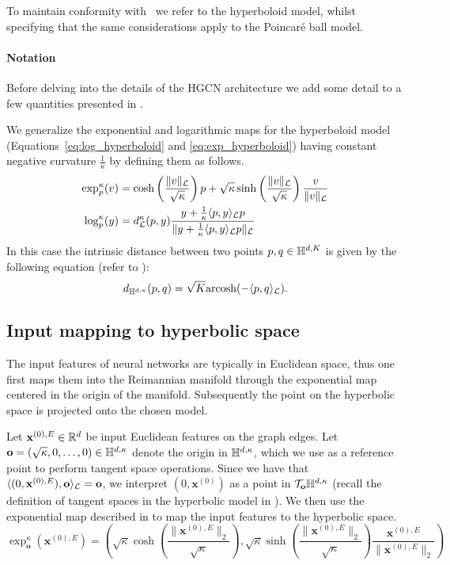 To maintain conformity with~\cite{chami2019HGCN} we refer to the hyperboloid model, whilst specifying that the same considerations apply to the Poincaré ball model.

\paragraph{Notation}
Before delving into the details of the HGCN architecture we add some detail to a few quantities presented in . 

We generalize the exponential and logarithmic maps for the hyperboloid model (Equations~\eqref{eq:log_hyperboloid} and \eqref{eq:exp_hyperboloid}) having constant negative curvature $\frac{1}{\kappa}$ by defining them as follows.
\begin{align}
    \exp_p^\kappa(v) &= \cosh\left(\frac{\|v\|_{\mathcal{L}}}{\sqrt{\kappa}}\right)p + \sqrt{\kappa}\sinh\left(\frac{\|v\|_{\mathcal{L}}}{\sqrt{\kappa}}\right) \frac{v}{\|v\|_{\mathcal{L}}} \label{eq:expk_hyperboloid}\\
    \log_p^\kappa(y) &= d_{\mathcal{L}}^\kappa(p,y)\frac{y + \frac{1}{\kappa}\langle p,y \rangle_{\mathcal{L}}p}{\|y + \frac{1}{\kappa}\langle p,y \rangle_{\mathcal{L}}p\|_{\mathcal{L}}} \label{eq:logk_hyperboloid}
\end{align}
In this case the intrinsic distance between two points $p, q\in\mathbb{H}^{d,K}$ is given by the following equation (refer to ):
\begin{equation*}
    d_{\mathbb{H}^{d,\kappa}}(p, q) = \sqrt{K}\text{arcosh}(-\langle p, q \rangle_{\mathcal{L}}).
\end{equation*}

\subsection{Input mapping to hyperbolic space}
The input features of neural networks are typically in Euclidean space, thus one first maps them into the Reimannian manifold through the exponential map centered in the origin of the manifold. Subsequently the point on the hyperbolic space is projected onto the chosen model.

Let $\mathbf{x}^{(0), E}\in\mathbb{R}^d$ be input Euclidean features on the graph edges. Let $\mathbf{o}=(\sqrt{\kappa}, 0, \dots,0)\in \mathbb{H}^{d,\kappa}$ denote the origin in $\mathbb{H}^{d,\kappa}$, which we use as a reference point to perform tangent space operations. Since we have that $\langle({0},\mathbf{x}^{(0), E}), \mathbf{o}\rangle_{\mathcal{L}}=\mathbf{o}$, we interpret $({0},\mathbf{x}^{(0)})$ as a point in $\mathcal{T}_\mathbf{o}\mathbb{H}^{d,\kappa}$ (recall the definition of tangent spaces in the hyperbolic model in ). We then use the exponential map described in  to map the input features to the hyperbolic space.
\begin{equation}
    \exp_{\mathbf{o}}^\kappa(\mathbf{x}^{(0), E}) = \left(\sqrt{\kappa}\cosh\left(\frac{\|\mathbf{x}^{(0), E}\|_2}{\sqrt{\kappa}}\right), \sqrt{\kappa}\sinh\left(\frac{\|\mathbf{x}^{(0), E}\|_2}{\sqrt{\kappa}}\right)\frac{\mathbf{x}^{(0), E}}{\|\mathbf{x}^{(0), E}\|_2}\right)
\end{equation}

